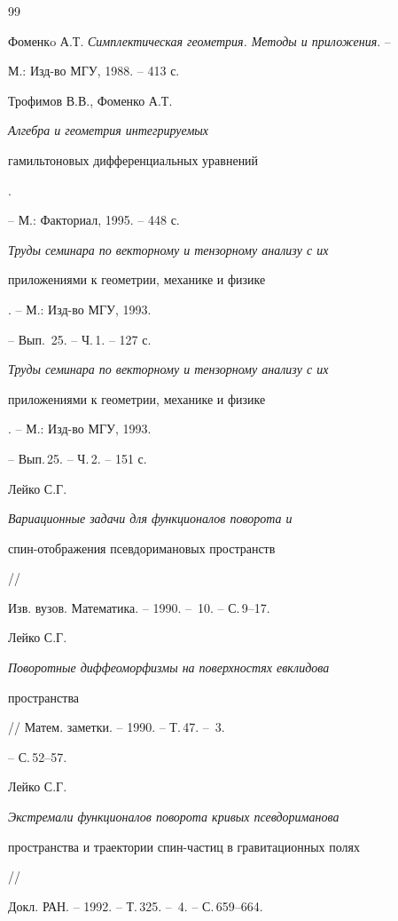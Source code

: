  


\begin{thebibliography}{99} 


 




Фоменкo А.Т. {\em Симплектическая геометрия. Методы и приложения}. -- 


М.: Изд-во МГУ, 1988. -- 413 с. 




Трофимов В.В., Фоменко А.Т. {\em Алгебра и геометрия интегрируемых 


гамильтоновых дифференциальных уравнений}. 


-- М.: Факториал, 1995. -- 448 с. 




{\em Труды семинара по векторному и тензорному анализу с их 


приложениями к геометрии, механике и физике}. -- М.: Изд-во МГУ, 1993. 


-- Вып.\, 25. -- Ч.\,1. -- 127 с. 




{\em Труды семинара по векторному и тензорному анализу с их 


приложениями к геометрии, механике и физике}. -- М.: Изд-во МГУ, 1993. 


-- Вып.\,25. -- Ч.\,2. -- 151 с. 




Лейко С.Г. {\em Вариационные задачи для функционалов поворота и 


спин-отображения псевдоримановых пространств} // 


Изв. вузов. Математика. -- 1990. -- \No\,10. -- С.\,9--17. 




Лейко С.Г. {\em Поворотные диффеоморфизмы на поверхностях евклидова 


пространства} // Матем. заметки. -- 1990. -- Т.\,47. -- \No\,3. 


-- С.\,52--57. 




Лейко С.Г. {\em Экстремали функционалов поворота кривых псевдориманова 


пространства и траектории спин-частиц в гравитационных полях} // 


Докл. РАН. -- 1992. -- Т.\,325. -- \No\,4. -- С.\,659--664. 





\end{thebibliography}
